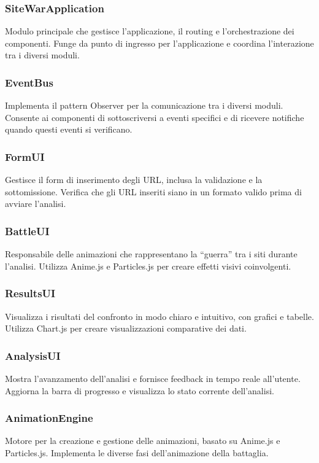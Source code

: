\subsubsection{SiteWarApplication}
Modulo principale che gestisce l'applicazione, il routing e l'orchestrazione dei componenti. Funge da punto di ingresso per l'applicazione e coordina l'interazione tra i diversi moduli.

\subsubsection{EventBus}
Implementa il pattern Observer per la comunicazione tra i diversi moduli. Consente ai componenti di sottoscriversi a eventi specifici e di ricevere notifiche quando questi eventi si verificano.

\subsubsection{FormUI}
Gestisce il form di inserimento degli URL, inclusa la validazione e la sottomissione. Verifica che gli URL inseriti siano in un formato valido prima di avviare l'analisi.

\subsubsection{BattleUI}
Responsabile delle animazioni che rappresentano la ``guerra'' tra i siti durante l'analisi. Utilizza Anime.js e Particles.js per creare effetti visivi coinvolgenti.

\subsubsection{ResultsUI}
Visualizza i risultati del confronto in modo chiaro e intuitivo, con grafici e tabelle. Utilizza Chart.js per creare visualizzazioni comparative dei dati.

\subsubsection{AnalysisUI}
Mostra l'avanzamento dell'analisi e fornisce feedback in tempo reale all'utente. Aggiorna la barra di progresso e visualizza lo stato corrente dell'analisi.

\subsubsection{AnimationEngine}
Motore per la creazione e gestione delle animazioni, basato su Anime.js e Particles.js. Implementa le diverse fasi dell'animazione della battaglia.

